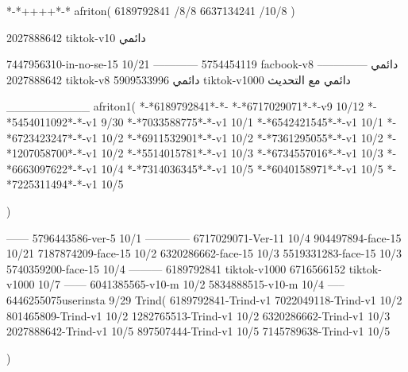 *-*++++*-*
afriton(
6189792841 /8/8
6637134241 /10/8
)

2027888642 tiktok-v10
دائمي


7447956310-in-no-se-15 10/21
------------
5754454119 facbook-v8
دائمي
--------------
2027888642 tiktok-v8
دائمي
5909533996 tiktok-v1000
دائمي مع التحديث

__________
afriton1(
*-*6189792841*-*-
*-*6717029071*-*-v9 10/12
*-*5454011092*-*-v1 9/30
*-*7033588775*-*-v1 10/1
*-*6542421545*-*-v1 10/1
*-*6723423247*-*-v1 10/2
*-*6911532901*-*-v1 10/2
*-*7361295055*-*-v1 10/2
*-*1207058700*-*-v1 10/2
*-*5514015781*-*-v1 10/3
*-*6734557016*-*-v1 10/3
*-*6663097622*-*-v1 10/4
*-*7314036345*-*-v1 10/5
*-*6040158971*-*-v1 10/5
*-*7225311494*-*-v1 10/5

)

------
5796443586-ver-5 10/1
------------
6717029071-Ver-11
10/4
904497894-face-15 10/21
7187874209-face-15 10/2
6320286662-face-15 10/3
5519331283-face-15 10/3
5740359200-face-15 10/4
---------
6189792841 tiktok-v1000
6716566152 tiktok-v1000
10/7
------
6041385565-v10-m 10/2
5834888515-v10-m 10/4
-----
6446255075userinsta 9/29
Trind(
6189792841-Trind-v1 
7022049118-Trind-v1 10/2
801465809-Trind-v1 10/2
1282765513-Trind-v1 10/2
6320286662-Trind-v1 10/3
2027888642-Trind-v1 10/5
897507444-Trind-v1 10/5
7145789638-Trind-v1 10/5

)

